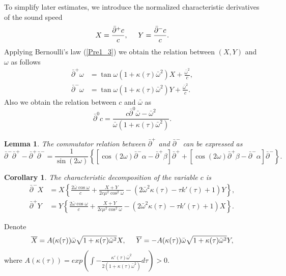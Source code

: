 \documentclass[3p,11pt]{elsarticle}
\numberwithin{equation}{section}
\newtheorem{lemma}{Lemma}[section]
\newtheorem{corollary}{Corollary}[section]
\begin{document}
To simplify later estimates, we introduce the normalized characteristic derivatives of the sound speed
\begin{equation}\label{Pre2_5}
    X=\frac{\bar\partial^+c}{c}, \hspace{5mm}  Y=\frac{\bar\partial^-c}{c}.
\end{equation}
Applying Bernoulli's law (\ref{Pre1_3}) we obtain the relation between $(X, Y)$ and $\omega$ as follows
\begin{equation}\label{Pre2_6}
    \begin{split}
        \bar\partial^+ \omega&= \tan\omega(1+\kappa(\tau)\bar\omega^2)X+\frac{\bar\omega^2}{c},\\
        \bar\partial^- \omega&= \tan\omega(1+\kappa(\tau)\bar\omega^2) Y+\frac{\bar\omega^2}{c}.
    \end{split}
\end{equation}
Also we obtain the relation between $c$ and $\bar\omega$ as
\begin{equation}\label{Pre2_7}
    \bar\partial^0c=\frac{c\bar\partial^0\bar\omega-\bar\omega^2}{\bar\omega(1+\kappa(\tau)\bar\omega^2)}.
\end{equation}
\begin{lemma}\label{Pre2_l1}
    The commutator relation between $\bar\partial^+$ and $\bar\partial^-$ can be expressed as \cite{Jliinteraction2009}
    \begin{equation*}
        \bar\partial^-\bar\partial^+-\bar\partial^+\bar\partial^-=\frac{1}{\sin(2\omega)}\left\{\left[\cos(2\omega)\bar\partial^-\alpha-\bar\partial^+\beta \right]\bar\partial^++ \left[\cos(2\omega)\bar\partial^+\beta-\bar\partial^-\alpha \right]\bar\partial^- \right\}.
    \end{equation*}
\end{lemma}

\begin{corollary} The characteristic decomposition of the variable $c$ is 
    \begin{equation}\label{Pre2_8}
    \begin{split}
        \bar\partial^-X &=X \left\{\frac{2\bar\omega\cos\omega}{c}+\frac{X+ Y}{2c\mu^2\cos^2\omega}-(2\bar\omega^2\kappa(\tau)-\tau k'(\tau)+1) Y \right\},\\
        \bar\partial^+ Y &= Y \left\{\frac{2\bar\omega\cos\omega}{c}+\frac{X+ Y}{2c\mu^2\cos^2\omega}-(2\bar\omega^2\kappa(\tau)-\tau k'(\tau)+1)X \right\}.
    \end{split}
\end{equation}
\end{corollary}
Denote
\begin{equation}\label{Pre2_9}
     \overline X=A(\kappa(\tau))\bar\omega\sqrt{1+\kappa(\tau)\bar\omega^2} X, \hspace{5mm}  \overline Y=-A(\kappa(\tau))\bar\omega\sqrt{1+\kappa(\tau)\bar\omega^2}  Y, 
\end{equation}
where $\displaystyle{A(\kappa(\tau))=exp\left(\int -\frac{\kappa'(\tau)\bar\omega^2}{2(1+\kappa(\tau)\bar\omega^2)} d\tau \right)}>0$. 
\end{document}
